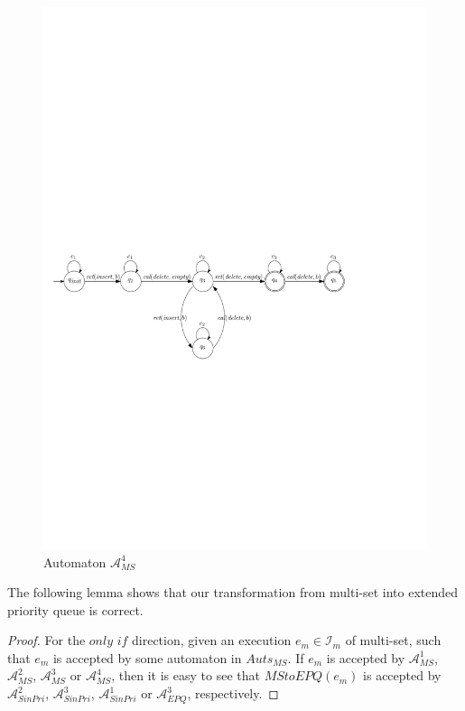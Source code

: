 {\begin{figure}[htbp]
  \centering
  \includegraphics[width=0.8 \textwidth]{figures/PIC_AUTO_MS_4.pdf}
  \caption{Automaton $\mathcal{A}_{\textit{MS}}^4$}
  \label{fig:automata 4 for MS-3 in appendix}
\end{figure}

The following lemma shows that our transformation from multi-set into extended priority queue is correct.

\RelateMultiSetwithEPQ*

\begin {proof}

For the $\textit{only if}$ direction, given an execution $e_m \in \mathcal{I}_m$ of multi-set, such that $e_m$ is accepted by some automaton in $\textit{Auts}_{\textit{MS}}$. If $e_m$ is accepted by $\mathcal{A}_{\textit{MS}}^1$, $\mathcal{A}_{\textit{MS}}^2$, $\mathcal{A}_{\textit{MS}}^3$ or $\mathcal{A}_{\textit{MS}}^4$, then it is easy to see that $\textit{MStoEPQ}(e_m)$ is accepted by $\mathcal{A}_{\textit{SinPri}}^2$, $\mathcal{A}_{\textit{SinPri}}^3$, $\mathcal{A}_{\textit{SinPri}}^1$ or $\mathcal{A}_{\textit{EPQ}}^3$, respectively.


\end{proof}}
